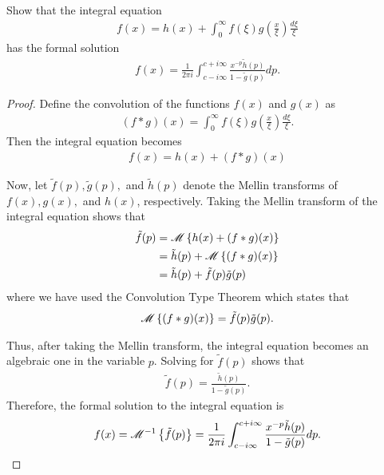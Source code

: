 \begin{problem}{8.10}
  Show that the integral equation
  \begin{align*}
    f(x) = h(x) + \int_0^\infty f(\xi) g\left(\frac{x}{\xi}\right) \frac{d\xi}{\xi}
  \end{align*}
  has the formal solution
  \begin{align*}
    f(x) = \frac{1}{2\pi i} \int_{c -i \infty}^{c + i \infty}\frac{x^{-p}\tilde{h}(p)}{1-\tilde{g}(p)} dp.
  \end{align*}
\end{problem}

\begin{proof}
  Define the convolution of the functions $f(x)$ and $g(x)$ as
  \begin{align*}
    (f \ast g)(x) = \int_0^\infty f(\xi) g\left(\frac{x}{\xi}\right) \frac{d\xi}{\xi}.
  \end{align*}
  Then the integral equation becomes
  \begin{align*}
    f(x) = h(x) + (f \ast g)(x)
  \end{align*}

  Now, let $\tilde{f}(p), \tilde{g}(p), $ and $\tilde{h}(p)$ denote the Mellin transforms
  of $f(x), g(x), $ and $h(x)$, respectively.
  Taking the Mellin transform of the integral equation shows that
  \begin{align*}
    \tilde{f}(p) &= \mathscr{M}\left\{ {h(x) + (f \ast g)(x)} \right\} \\
    &= \tilde{h}(p) + \mathscr{M}\left\{ {(f \ast g)(x)} \right\} \\
    &= \tilde{h}(p) + \tilde{f}(p) \tilde{g}(p)
  \end{align*}
  where we have used the Convolution Type Theorem which states that
  \begin{align*}
    \mathscr{M}\left\{ {(f \ast g)(x)} \right\} = \tilde{f}(p) \tilde{g}(p).
  \end{align*}

  Thus, after taking the Mellin transform, the integral equation becomes an algebraic one
  in the variable $p$. Solving for $\tilde{f}(p)$ shows that
  \begin{align*}
    \tilde{f}(p) = \frac{\tilde{h}(p)}{1 - \tilde{g}(p)}.
  \end{align*}
  Therefore, the formal solution to the integral equation is
  \begin{align*}
    f(x) = \mathscr{M}^{-1}\left\{ {\tilde{f}(p)} \right\} = \frac{1}{2\pi i} \int_{c -i \infty}^{c + i \infty}\frac{x^{-p}\tilde{h}(p)}{1-\tilde{g}(p)} dp.
  \end{align*}
\end{proof}
\newpage
